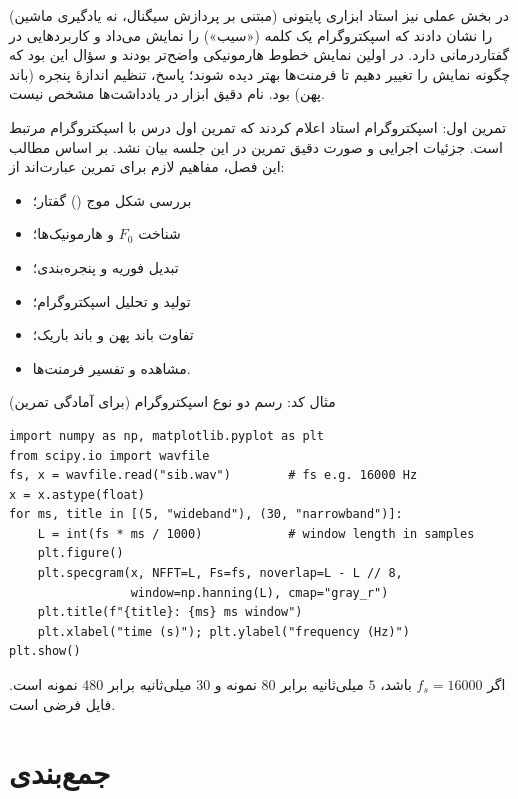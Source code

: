 در بخش عملی نیز استاد ابزاری پایتونی (مبتنی بر پردازش سیگنال، نه یادگیری ماشین) را نشان دادند که اسپکتروگرام یک کلمه («سیب») را نمایش می‌داد و کاربردهایی در گفتاردرمانی دارد. در اولین نمایش خطوط هارمونیکی واضح‌تر بودند و سؤال این بود که چگونه نمایش را تغییر دهیم تا فرمنت‌ها بهتر دیده شوند؛ پاسخ، تنظیم اندازهٔ پنجره (باند پهن) بود. نام دقیق ابزار در یادداشت‌ها مشخص نیست.

\begin{assignmentbox}{تمرین اول: اسپکتروگرام}
استاد اعلام کردند که تمرین اول درس با اسپکتروگرام مرتبط است. جزئیات اجرایی و صورت دقیق تمرین در این جلسه بیان نشد. بر اساس مطالب این فصل، مفاهیم لازم برای تمرین عبارت‌اند از:
\begin{itemize}
  \item بررسی شکل موج () گفتار؛
  \item شناخت $F_0$ و هارمونیک‌ها؛
  \item تبدیل فوریه و پنجره‌بندی؛
  \item تولید و تحلیل اسپکتروگرام؛
  \item تفاوت باند پهن و باند باریک؛
  \item مشاهده و تفسیر فرمنت‌ها.
\end{itemize}
\end{assignmentbox}

\begin{addedbox}{مثال کد: رسم دو نوع اسپکتروگرام (برای آمادگی تمرین)}
\begin{latin}
\begin{verbatim}
import numpy as np, matplotlib.pyplot as plt
from scipy.io import wavfile
fs, x = wavfile.read("sib.wav")        # fs e.g. 16000 Hz
x = x.astype(float)
for ms, title in [(5, "wideband"), (30, "narrowband")]:
    L = int(fs * ms / 1000)            # window length in samples
    plt.figure()
    plt.specgram(x, NFFT=L, Fs=fs, noverlap=L - L // 8,
                 window=np.hanning(L), cmap="gray_r")
    plt.title(f"{title}: {ms} ms window")
    plt.xlabel("time (s)"); plt.ylabel("frequency (Hz)")
plt.show()
\end{verbatim}
\end{latin}
اگر $f_s=16000$ باشد، $5$ میلی‌ثانیه برابر $80$ نمونه و $30$ میلی‌ثانیه برابر $480$ نمونه است. فایل  فرضی است.
\end{addedbox}

\section{جمع‌بندی}

